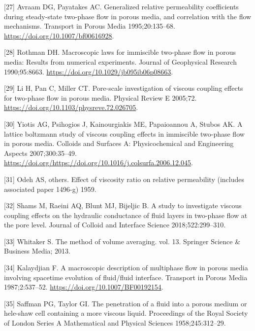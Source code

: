 \documentclass[]{article}
\begin{document}
\leavevmode\hypertarget{ref-Avraam1995}{}%
{[}27{]} Avraam DG, Payatakes AC. Generalized relative permeability
coefficients during steady-state two-phase flow in porous media, and
correlation with the flow mechanisms. Transport in Porous Media
1995;20:135--68. \url{https://doi.org/10.1007/bf00616928}.

\leavevmode\hypertarget{ref-Rothman1990}{}%
{[}28{]} Rothman DH. Macroscopic laws for immiscible two-phase flow in
porous media: Results from numerical experiments. Journal of Geophysical
Research 1990;95:8663. \url{https://doi.org/10.1029/jb095ib06p08663}.

\leavevmode\hypertarget{ref-Li2005}{}%
{[}29{]} Li H, Pan C, Miller CT. Pore-scale investigation of viscous
coupling effects for two-phase flow in porous media. Physical Review E
2005;72. \url{https://doi.org/10.1103/physreve.72.026705}.

\leavevmode\hypertarget{ref-Yiotis2007}{}%
{[}30{]} Yiotis AG, Psihogios J, Kainourgiakis ME, Papaioannou A, Stubos
AK. A lattice boltzmann study of viscous coupling effects in immiscible
two-phase flow in porous media. Colloids and Surfaces A: Physicochemical
and Engineering Aspects 2007;300:35--49.
\url{https://doi.org/https://doi.org/10.1016/j.colsurfa.2006.12.045}.

\leavevmode\hypertarget{ref-odeh1959effect}{}%
{[}31{]} Odeh AS, others. Effect of viscosity ratio on relative
permeability (includes associated paper 1496-g) 1959.

\leavevmode\hypertarget{ref-shams2018study}{}%
{[}32{]} Shams M, Raeini AQ, Blunt MJ, Bijeljic B. A study to
investigate viscous coupling effects on the hydraulic conductance of
fluid layers in two-phase flow at the pore level. Journal of Colloid and
Interface Science 2018;522:299--310.

\leavevmode\hypertarget{ref-Whitaker2013}{}%
{[}33{]} Whitaker S. The method of volume averaging. vol. 13. Springer
Science \& Business Media; 2013.

\leavevmode\hypertarget{ref-Kalaydjian1987}{}%
{[}34{]} Kalaydjian F. A macroscopic description of multiphase flow in
porous media involving spacetime evolution of fluid/fluid interface.
Transport in Porous Media 1987;2:537--52.
\url{https://doi.org/10.1007/BF00192154}.

\leavevmode\hypertarget{ref-saffman1958penetration}{}%
{[}35{]} Saffman PG, Taylor GI. The penetration of a fluid into a porous
medium or hele-shaw cell containing a more viscous liquid. Proceedings
of the Royal Society of London Series A Mathematical and Physical
Sciences 1958;245:312--29.
\end{document}
